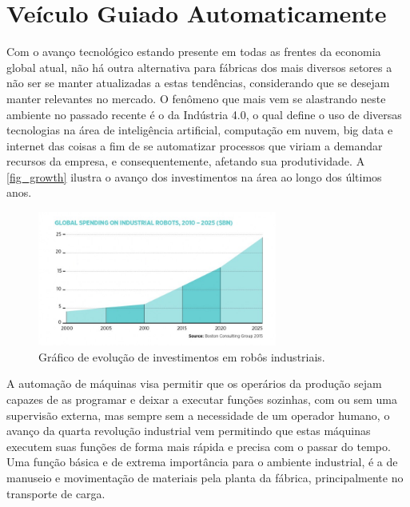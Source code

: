 \section{Ve{\'i}culo Guiado Automaticamente}

Com o avanço tecnológico estando presente em todas as frentes da economia
global atual, não há outra alternativa para fábricas dos mais diversos setores
a não ser se manter atualizadas a estas tendências, considerando que se desejam
manter relevantes no mercado. O fenômeno que mais vem se alastrando neste
ambiente no passado recente é o da Indústria 4.0, o qual define o uso de
diversas tecnologias na área de inteligência artificial, computação em nuvem,
big data e internet das coisas a fim de se automatizar processos que viriam a
demandar recursos da empresa, e consequentemente, afetando sua produtividade.
A \autoref{fig_growth} ilustra o avan{\c c}o dos investimentos na {\'a}rea ao longo
dos {\'u}ltimos anos.

\begin{figure}[htb]
        \centering
        \caption{\label{fig_growth}Gr{\'a}fico de evolu{\c c}{\~a}o de investimentos em rob{\^o}s industriais.}
        \includegraphics[width=0.7\textwidth]{images/Global-spending-industrial-robots-760x428.png}
\end{figure}


A automação de máquinas visa permitir que os operários da produção sejam
capazes de as programar e deixar a executar funções sozinhas, com ou sem uma
supervisão externa, mas sempre sem a necessidade de um operador humano, o
avanço da quarta revolução industrial vem permitindo que estas máquinas
executem suas funções de forma mais rápida e precisa com o passar do tempo. Uma
função básica e de extrema importância para o ambiente industrial, é a de
manuseio e movimentação de materiais pela planta da fábrica, principalmente no
transporte de carga. 


